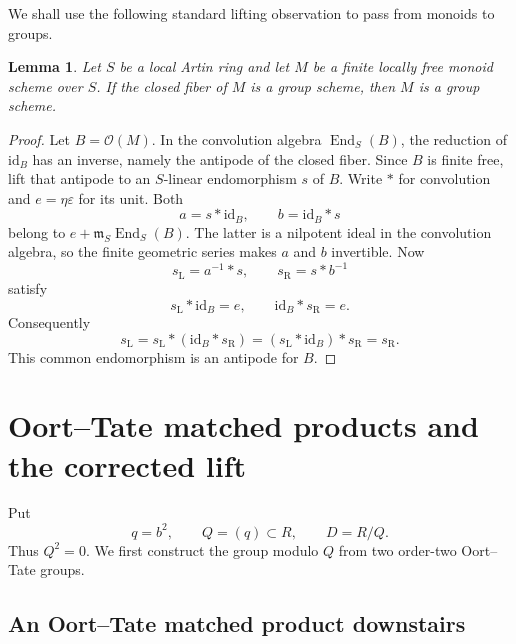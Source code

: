 \documentclass[11pt]{amsart}
\newtheorem{lemma}[theorem]{Lemma}
\theoremstyle{remark}
\newcommand{\eps}{\varepsilon}
\begin{document}
We shall use the following standard lifting observation to pass from
monoids to groups.

\begin{lemma}\label{lem:monoid-to-group}
Let \(S\) be a local Artin ring and let \(M\) be a finite locally free
monoid scheme over \(S\).  If the closed fiber of \(M\) is a group
scheme, then \(M\) is a group scheme.
\end{lemma}

\begin{proof}
Let \(B=\mathcal O(M)\).  In the convolution algebra
\(\operatorname{End}_S(B)\), the reduction of
\(\mathrm{id}_B\) has an inverse, namely the antipode of the closed
fiber.  Since \(B\) is finite free, lift that antipode to an
\(S\)-linear endomorphism \(s\) of \(B\).  Write \(*\) for convolution
and \(e=\eta\eps\) for its unit.  Both
\[
 a=s*\mathrm{id}_B,\qquad b=\mathrm{id}_B*s
\]
belong to \(e+\mathfrak m_S\operatorname{End}_S(B)\).  The latter is a
nilpotent ideal in the convolution algebra, so the finite geometric
series makes \(a\) and \(b\) invertible.  Now
\[
 s_{\mathrm L}=a^{-1}*s,\qquad
 s_{\mathrm R}=s*b^{-1}
\]
satisfy
\[
 s_{\mathrm L}*\mathrm{id}_B=e,\qquad
 \mathrm{id}_B*s_{\mathrm R}=e.
\]
Consequently
\[
 s_{\mathrm L}
 =s_{\mathrm L}*(\mathrm{id}_B*s_{\mathrm R})
 =(s_{\mathrm L}*\mathrm{id}_B)*s_{\mathrm R}
 =s_{\mathrm R}.
\]
This common endomorphism is an antipode for \(B\).
\end{proof}

\section{Oort--Tate matched products and the corrected lift}
\label{sec:construction}

Put
\[
 q=b^2,\qquad Q=(q)\subset R,\qquad D=R/Q.
\]
Thus \(Q^2=0\).  We first construct the group modulo \(Q\) from two
order-two Oort--Tate groups.

\subsection{An Oort--Tate matched product downstairs}
\end{document}
